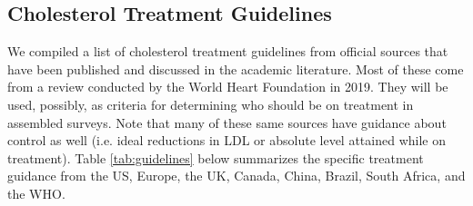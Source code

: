 \documentclass[12pt]{article}
\begin{document}
\begin{appendix}
    \subsection{Cholesterol Treatment Guidelines}

    We compiled a list of cholesterol treatment guidelines from official sources that have been published and discussed in the academic literature. Most of these come from a review conducted by the World Heart Foundation in 2019. They will be used, possibly, as criteria for determining who should be on treatment in assembled surveys. Note that many of these same sources have guidance about control as well (i.e. ideal reductions in LDL or absolute level attained while on treatment). Table \ref{tab:guidelines} below summarizes the specific treatment guidance from the US, Europe, the UK, Canada, China, Brazil, South Africa, and the WHO. 


\end{appendix}
\end{document}
